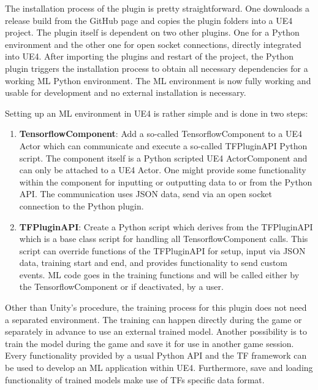 \documentclass[MGS,Master,english]{twbook}%
\begin{document}
The installation process of the plugin is pretty straightforward. One downloads a release build from the GitHub page and copies the plugin folders into a \ac{UE4} project. The plugin itself is dependent on two other plugins. One for a Python environment and the other one for open socket connections, directly integrated into UE4. After importing the plugins and restart of the project, the Python plugin triggers the installation process to obtain all necessary dependencies for a working ML Python environment. The ML environment is now fully working and usable for development and no external installation is necessary.

Setting up an ML environment in UE4 is rather simple and is done in two steps:
\begin{enumerate}
	\item \textbf{TensorflowComponent}: Add a so-called TensorflowComponent to a UE4 Actor which can communicate and execute a so-called TFPluginAPI Python script. The component itself is a Python scripted UE4 ActorComponent and can only be attached to a UE4 Actor. One might provide some functionality within the component for inputting or outputting data to or from the Python API. The communication uses JSON data, send via an open socket connection to the Python plugin.
	\item \textbf{TFPluginAPI}: Create a Python script which derives from the TFPluginAPI which is a base class script for handling all TensorflowComponent calls. This script can override functions of the TFPluginAPI for setup, input via JSON data, training start and end, and provides functionality to send custom events. ML code goes in the training functions and will be called either by the TensorflowComponent or if deactivated, by a user.
\end{enumerate}

Other than Unity’s procedure, the training process for this plugin does not need a separated environment. The training can happen directly during the game or separately in advance to use an external trained model. Another possibility is to train the model during the game and save it for use in another game session. Every functionality provided by a usual Python API and the \ac{TF} framework can be used to develop an ML application within UE4. Furthermore, save and loading functionality of trained models make use of \acp{TF} specific data format.
\end{document}
